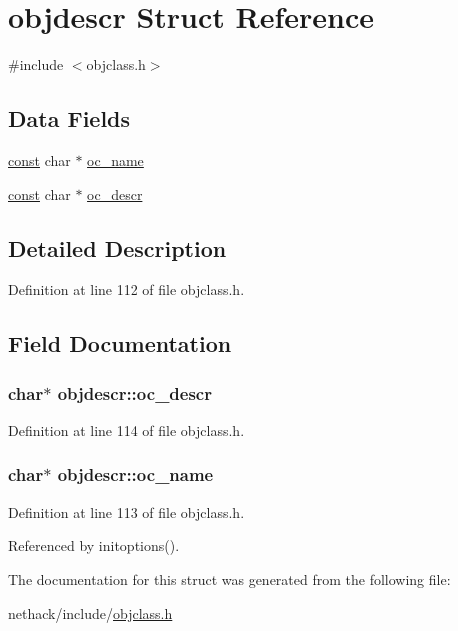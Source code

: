 \hypertarget{structobjdescr}{\section{objdescr Struct Reference}
\label{structobjdescr}
}


{\ttfamily \#include $<$objclass.\+h$>$}

\subsection*{Data Fields}
\begin{DoxyCompactItemize}
\item 
\hyperlink{tradstdc_8h_a2c212835823e3c54a8ab6d95c652660e}{const} char $\ast$ \hyperlink{structobjdescr_ae8e7d7a6a614b996429c42891b2e7b1e}{oc\+\_\+name}
\item 
\hyperlink{tradstdc_8h_a2c212835823e3c54a8ab6d95c652660e}{const} char $\ast$ \hyperlink{structobjdescr_aa0ca28ef77bcd2ae6933a5e40a145db4}{oc\+\_\+descr}
\end{DoxyCompactItemize}


\subsection{Detailed Description}


Definition at line 112 of file objclass.\+h.



\subsection{Field Documentation}
\hypertarget{structobjdescr_aa0ca28ef77bcd2ae6933a5e40a145db4}{
\subsubsection[{oc\+\_\+descr}]{ char$\ast$ objdescr\+::oc\+\_\+descr}}\label{structobjdescr_aa0ca28ef77bcd2ae6933a5e40a145db4}


Definition at line 114 of file objclass.\+h.

\hypertarget{structobjdescr_ae8e7d7a6a614b996429c42891b2e7b1e}{
\subsubsection[{oc\+\_\+name}]{ char$\ast$ objdescr\+::oc\+\_\+name}}\label{structobjdescr_ae8e7d7a6a614b996429c42891b2e7b1e}


Definition at line 113 of file objclass.\+h.



Referenced by initoptions().



The documentation for this struct was generated from the following file\+:\begin{DoxyCompactItemize}
\item 
nethack/include/\hyperlink{objclass_8h}{objclass.\+h}\end{DoxyCompactItemize}
